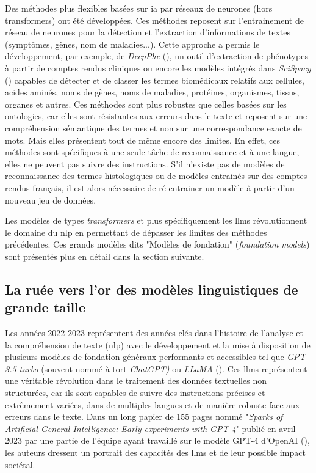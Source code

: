 Des méthodes plus flexibles basées sur \gls{ia} par réseaux de neurones (hors transformers) ont été développées. Ces méthodes reposent sur l'entrainement de réseau de neurones pour la détection et l'extraction d'informations de textes (symptômes, gènes, nom de maladies...). Cette approche a permis le développement, par exemple, de \textit{DeepPhe} (\cite{savova_deepphe_2017}), un outil d'extraction de phénotypes à partir de comptes rendus cliniques ou encore les modèles intégrés dans \textit{SciSpacy} (\cite{neumann_scispacy_2019}) capables de détecter et de classer les termes biomédicaux relatifs aux cellules, acides aminés, noms de gènes, noms de maladies, protéines, organismes, tissus, organes et autres. Ces méthodes sont plus robustes que celles basées sur les ontologies, car elles sont résistantes aux erreurs dans le texte et reposent sur une compréhension sémantique des termes et non sur une correspondance exacte de mots. Mais elles présentent tout de même encore des limites. En effet, ces méthodes sont spécifiques à une seule tâche de reconnaissance et à une langue, elles ne peuvent pas suivre des instructions. S’il n'existe pas de modèles de reconnaissance des termes histologiques ou de modèles entrainés sur des comptes rendus français, il est alors nécessaire de ré-entrainer un modèle à partir d'un nouveau jeu de données. 


Les modèles de types \textit{transformers} et plus spécifiquement les \gls{llms} révolutionnent le domaine du \gls{nlp} en permettant de dépasser les limites des méthodes précédentes. Ces grands modèles dits "Modèles de fondation" (\textit{foundation models}) sont présentés plus en détail dans la section suivante.

\subsection{La ruée vers l'or des modèles linguistiques de grande taille}\label{chap2_llms}
Les années 2022-2023 représentent des années clés dans l’histoire de l'analyse et la compréhension de texte (\gls{nlp}) avec le développement et la mise à disposition de plusieurs modèles de fondation généraux performants et accessibles tel que \textit{GPT-3.5-turbo} (souvent nommé à tort \textit{ChatGPT)} ou \textit{LLaMA} (\cite{touvron_llama_2023}). Ces \gls{llms} représentent une véritable révolution dans le traitement des données textuelles non structurées, car ils sont capables de suivre des instructions précises et extrêmement variées, dans de multiples langues et de manière robuste face aux erreurs dans le texte. Dans un long papier de 155 pages nommé "\textit{Sparks of Artificial General Intelligence: Early experiments with GPT-4}" publié en avril 2023 par une partie de l'équipe ayant travaillé sur le modèle GPT-4 d'OpenAI (\cite{bubeck_sparks_2023}), les auteurs dressent un portrait des capacités des \gls{llms} et de leur possible impact sociétal.


